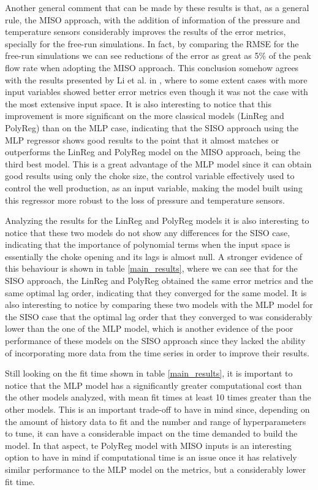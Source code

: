 \documentclass[conference]{IEEEtran}
\begin{document}
Another general comment that can be made by these results is that, as a general rule, the MISO approach, with the addition of information of the pressure and temperature sensors considerably improves the results of the error metrics, specially for the free-run simulations. In fact, by comparing the RMSE for the free-run simulations we can see reductions of the error as great as 5\% of the peak flow rate when adopting the MISO approach. This conclusion somehow agrees with the results presented by Li et al. in \cite{Li2019}, where to some extent cases with more input variables showed better error metrics even though it was not the case with the most extensive input space. It is also interesting to notice that this improvement is more significant on the more classical models (LinReg and PolyReg) than on the MLP case, indicating that the SISO approach using the MLP regressor shows good results to the point that it almost matches or outperforms the LinReg and PolyReg model on the MISO approach, being the third best model. This is a great advantage of the MLP model since it can obtain good results using only the choke size, the control variable effectively used to control the well production, as an input variable, making the model built using this regressor more robust to the loss of pressure and temperature sensors.

Analyzing the results for the LinReg and PolyReg models it is also interesting to notice that these two models do not show any differences for the SISO case, indicating that the importance of polynomial terms when the input space is essentially the choke opening and its lags is almost null. A stronger evidence of this behaviour is shown in table \ref{main_results}, where we can see that for the SISO approach, the LinReg and PolyReg obtained the same error metrics and the same optimal lag order, indicating that they converged for the same model. It is also interesting to notice by comparing these two models with the MLP model for the SISO case that the optimal lag order that they converged to was considerably lower than the one of the MLP model, which is another evidence of the poor performance of these models on the SISO approach since they lacked the ability of incorporating more data from the time series in order to improve their results.

Still looking on the fit time shown in table \ref{main_results}, it is important to notice that the MLP model has a significantly greater computational cost than the other models analyzed, with mean fit times at least 10 times greater than the other models. This is an important trade-off to have in mind since, depending on the amount of history data to fit and the number and range of hyperparameters to tune, it can have a considerable impact on the time demanded to build the model. In that aspect, te PolyReg model with MISO inputs is an interesting option to have in mind if computational time is an issue once it has relatively similar performance to the MLP model on the metrics, but a considerably lower fit time.
\end{document}
